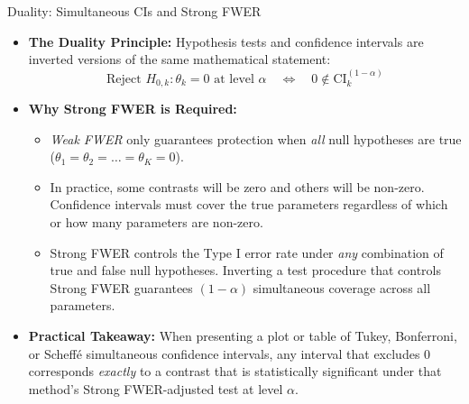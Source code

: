 \begin{frame}{Duality: Simultaneous CIs and Strong FWER}
  \begin{itemize}
    \item \textbf{The Duality Principle:} Hypothesis tests and confidence intervals are inverted versions of the same mathematical statement:
    $$
    \text{Reject } H_{0,k}: \theta_k = 0 \text{ at level } \alpha \quad \iff \quad 0 \notin \text{CI}_k^{(1-\alpha)}
    $$

    \item \textbf{Why Strong FWER is Required:}
    \begin{itemize}
      \item \emph{Weak FWER} only guarantees protection when \emph{all} null hypotheses are true ($\theta_1 = \theta_2 = \dots = \theta_K = 0$).
      \item In practice, some contrasts will be zero and others will be non-zero. Confidence intervals must cover the true parameters \alert{regardless of which or how many parameters are non-zero}.
      \item \alert{Strong FWER} controls the Type I error rate under \emph{any} combination of true and false null hypotheses. Inverting a test procedure that controls Strong FWER guarantees $(1-\alpha)$ simultaneous coverage across all parameters.
    \end{itemize}

    \item \textbf{Practical Takeaway:} When presenting a plot or table of Tukey, Bonferroni, or Scheffé simultaneous confidence intervals, any interval that excludes $0$ corresponds \emph{exactly} to a contrast that is statistically significant under that method's Strong FWER-adjusted test at level $\alpha$.
  \end{itemize}


\end{frame}



